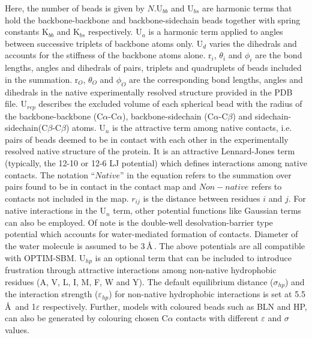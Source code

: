 \documentclass[journal=jacsat]{achemso}
\begin{document}
Here, the number of beads is given by $N$.U$_{bb}$ and U$_{bs}$ are harmonic terms that hold the backbone-backbone and backbone-sidechain beads together with spring constants K$_{bb}$ and K$_{bs}$ respectively. U$_{a}$ is a harmonic term applied to angles between successive triplets of backbone atoms only. U$_{d}$ varies the dihedrals and accounts  for the stiffness of the backbone atoms alone. r$_{i}$, $\theta_{i}$ and $\phi_{i}$ are the bond lengths, angles and dihedrals of pairs, triplets and quadruplets of beads included in the summation. r$_{O}$, $\theta_{O}$ and $\phi_{O}$ are the corresponding bond lengths, angles and dihedrals in the native experimentally resolved structure provided in the PDB file. U$_{rep}$ describes the excluded volume of each spherical bead with the radius of the backbone-backbone (C$\alpha$-C$\alpha$), backbone-sidechain (C$\alpha$-C$\beta$) and sidechain-sidechain(C$\beta$-C$\beta$) atoms. U$_n$ is the attractive term among native contacts, i.e. pairs of beads deemed to be in contact with each other in the experimentally resolved native structure of the protein. It is an attractive Lennard-Jones term (typically, the 12-10 or 12-6 LJ potential) which defines interactions among native contacts\cite{Cieplak09a,smog}. The notation ``$Native$'' in the equation refers to the summation over pairs found to be in contact in the contact map and $Non-native$ refers to contacts not included in the map. $r_{ij}$ is the distance between residues $i$ and $j$. For native interactions in the U$_n$ term, other potential functions like Gaussian terms can also be employed. Of note is the double-well desolvation-barrier type potential\cite{Rank09a,Liu05a} which accounts for water-mediated formation of contacts. Diameter of the water molecule is assumed to be 3\,\AA\,. The above potentials are all compatible with OPTIM-SBM. 
 U$_{hp}$ is an optional term that can be included to introduce frustration through attractive interactions among non-native hydrophobic residues (A, V, L, I, M, F, W and Y). The default equilibrium distance ($\sigma_{hp}$) and the interaction strength ($\varepsilon_{hp}$) for non-native hydrophobic interactions is set at 5.5\,\AA\ and 1$\varepsilon$ respectively. Further, models with coloured beads such as BLN\cite{Honeycutt90a} and HP\cite{Dill89a}, can also be generated by colouring chosen C$\alpha$ contacts with different $\varepsilon$ and $\sigma$ values. 
 
\end{document}
